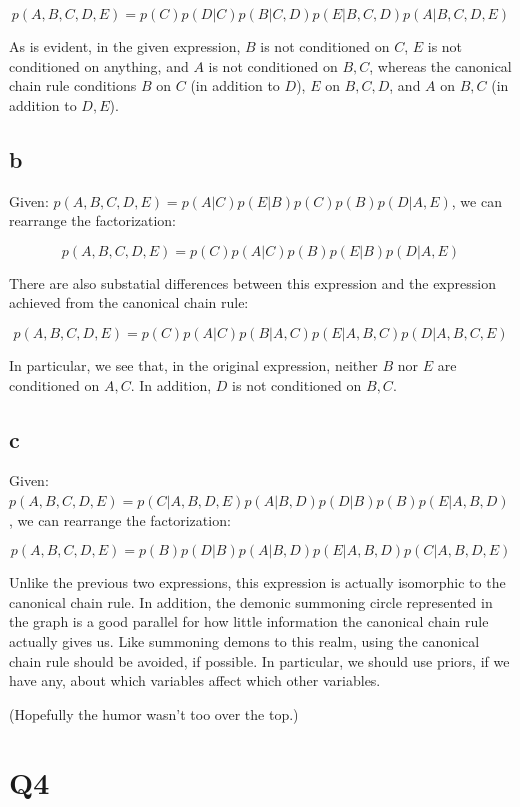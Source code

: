 \documentclass{article}
\begin{document}
$$
p(A, B, C, D, E) = p(C) p(D | C) p(B | C, D) p(E | B, C, D) p(A | B, C, D, E)
$$

As is evident, in the given expression, $B$ is not conditioned on $C$, $E$ is not 
conditioned on anything, and $A$ is not conditioned on $B, C$, whereas the 
canonical chain rule conditions $ B $ on $C$ (in addition to $ D$), $E$ on $B, C, D$, 
and $A$ on $B, C$ (in addition to $D, E$).

\subsection{b}

Given: $ p(A, B, C, D, E) = p(A | C) p(E | B) p(C) p(B) p(D | A, E) $, we can 
rearrange the factorization:

$$
p(A, B, C, D, E) = p(C) p(A | C) p(B) p(E | B) p(D | A, E)
$$

There are also substatial differences between this expression and the 
expression achieved from the canonical chain rule:

$$
p(A, B, C, D, E) = p(C) p(A | C) p(B | A, C) p(E | A, B, C) p(D | A, B, C, E)
$$

In particular, we see that, in the original expression, neither $B$ nor $E$ are 
conditioned on $A, C$. In addition, $D$ is not conditioned on $B, C$.

\subsection{c}

Given: $ p(A, B, C, D, E) = p(C | A, B, D, E) p(A | B, D) p(D | B) p(B) p(E | A, B, D) $, 
we can rearrange the factorization:

$$
p(A, B, C, D, E) = p(B) p(D | B) p(A | B, D) p(E | A, B, D) p(C | A, B, D, E)
$$

Unlike the previous two expressions, this expression is actually isomorphic 
to the canonical chain rule. In addition, the demonic summoning circle 
represented in the graph is a good parallel for how little information the 
canonical chain rule actually gives us. Like summoning demons to this realm, 
using the canonical chain rule should be avoided, if possible. In particular, 
we should use priors, if we have any, about which variables affect which other 
variables.

(Hopefully the humor wasn't too over the top.)

\section{Q4}
\end{document}
